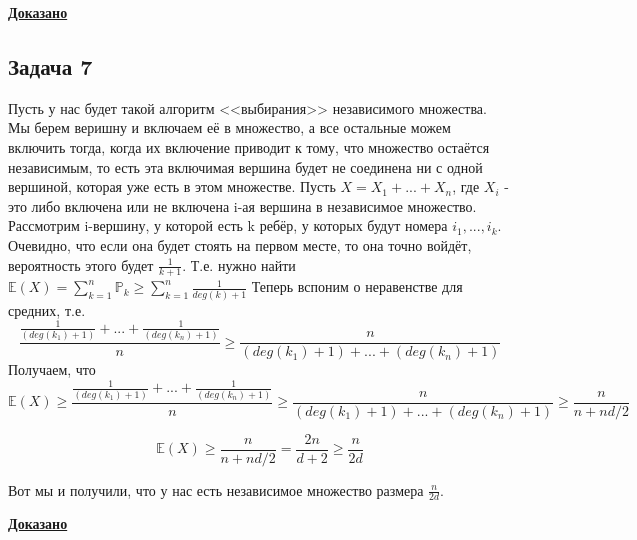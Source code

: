 \documentclass[a4paper,14pt]{article} %
\begin{document}
\underline{\textbf{Доказано}}

\subsection{Задача 7}
Пусть у нас будет такой алгоритм <<выбирания>> независимого множества.
Мы берем веришну и включаем её в множество, а все остальные можем включить тогда, когда их включение приводит к тому, что множество остаётся независимым, 
то есть эта включимая вершина будет не соединена ни с одной вершиной, которая уже есть в этом множестве.
\newline
Пусть $X = X_1 + ... + X_n$, где $X_i$ - это либо включена или не включена i-ая вершина в независимое множество.
\newline
Рассмотрим i-вершину, у которой есть k ребёр, у которых будут номера $i_1, ..., i_k$.
Очевидно, что если она будет стоять на первом месте, то она точно войдёт, вероятность этого будет $\frac{1}{k+1}$.
\newline
Т.е. нужно найти $\mathds{E}(X) = \sum\limits_{k = 1}^n \mathds{P}_k \geq \sum\limits_{k = 1}^n \frac{1}{deg(k)+1} $
\newline 
Теперь вспоним о неравенстве для средних, т.е.
\begin{equation*}
	\frac{\frac{1}{(deg(k_1) + 1)} + ... +\frac{1}{(deg(k_n) + 1)}}{n} \geq \frac{n}{(deg(k_1) +1) + ... + (deg(k_n) +1)}
\end{equation*}
Получаем, что 
\begin{equation*}
\mathds{E}(X) \geq \frac{\frac{1}{(deg(k_1) + 1)} + ... +\frac{1}{(deg(k_n) + 1)}}{n} \geq \frac{n}{(deg(k_1) +1) + ... + (deg(k_n) +1)} \geq \frac{n}{n + nd/2} 
\end{equation*}

\begin{equation*}
	\mathds{E}(X) \geq \frac{n}{n + nd/2} = \frac{2n}{d + 2} \geq \frac{n}{2d}
\end{equation*}

Вот мы и получили, что у нас есть независимое множество размера $\frac{n}{2d}$.

\underline{\textbf{Доказано}}
\end{document}
